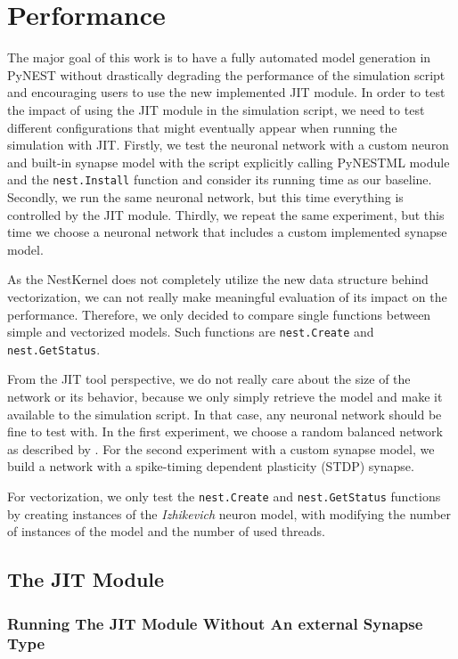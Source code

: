 \chapter{Performance}
 \label{chap:perf}
 
 The major goal of this work is to have a fully automated model generation in PyNEST without drastically degrading the performance of the simulation script and encouraging users to use the new implemented JIT module. In order to test the impact of using the JIT module in the simulation script, we need to test different configurations that might eventually appear when running the simulation with JIT. Firstly, we test the neuronal network with a custom neuron and built-in synapse model with the script explicitly calling PyNESTML module and the \texttt{nest.Install} function and  consider its running time as our baseline. Secondly, we run the same neuronal network, but this time everything is controlled by the JIT module. Thirdly, we repeat the same experiment, but this time we choose a neuronal network that includes a custom implemented synapse model.
 
 As the NestKernel does not completely utilize the new data structure behind vectorization, we can not really make meaningful evaluation of its impact on the performance. Therefore, we only decided to compare single functions between simple and vectorized models. Such functions are \texttt{nest.Create} and \texttt{nest.GetStatus}.
 
 From the JIT tool perspective, we do not really care about the size of the network or its behavior, because we only simply retrieve the model and make it available to the simulation script. In that case, any neuronal network should be fine to test with. In the first experiment, we choose a random balanced network as  described by \citep{brunel2000dynamics}. For the second experiment with a custom synapse model, we build a network with a spike-timing dependent plasticity (STDP) synapse.
 
 
 For vectorization, we only test the \texttt{nest.Create} and \texttt{nest.GetStatus} functions by creating instances of the \emph{Izhikevich} \citep{1257420} neuron model, with modifying the number of instances of the model and the number of used threads.
 
\section{The JIT Module}

\subsection*{Running The JIT Module Without An external Synapse Type}

